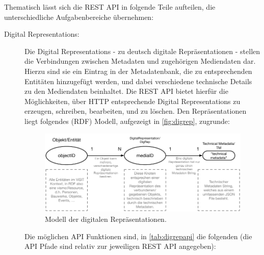 Thematisch lässt sich die REST API in folgende Teile aufteilen, die unterschiedliche Aufgabenbereiche übernehmen:

\begin{description}
	\item[Digital Representations:] Die Digital Representations - zu deutsch digitale Repräsentationen - stellen die Verbindungen zwischen Metadaten und zugehörigen Mediendaten dar. Hierzu sind sie ein Eintrag in der Metadatenbank, die zu entsprechenden Entitäten hinzugefügt werden, und dabei verschiedene technische Details zu den Mediendaten beinhaltet. Die REST API bietet hierfür die Möglichkeiten, über HTTP entsprechende Digital Representations zu erzeugen, schreiben, bearbeiten, und zu löschen. Den Repräsentationen liegt folgendes (RDF) Modell, aufgezeigt in \autoref{fig:digrep}, zugrunde:
	
	\begin{figure}[htb]
    	\centering
	    \includegraphics[width=\textwidth]{Figures/berndl/digrep}
    	\caption{\label{fig:digrep} Modell der digitalen Repräsentationen.}
	\end{figure}
	
	Die möglichen API Funktionen sind, in \autoref{tab:digrepapi} die folgenden (die API Pfade sind relativ zur jeweiligen REST API angegeben):
	

\end{description}
